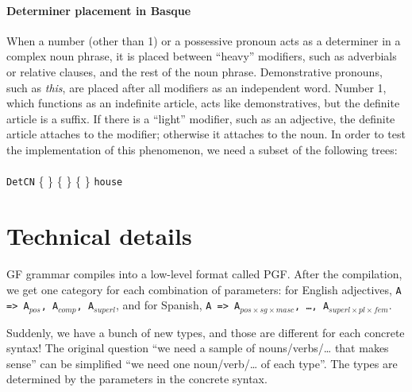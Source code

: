 \documentclass[11pt]{article}
\def\t#1{\texttt{#1}}
\newcommand{\tts}[1]{{\tt #1}}
\begin{document}


\paragraph{Determiner placement in Basque} When a number (other than 1) or a
possessive pronoun acts as a determiner in a complex noun phrase, it
is placed between ``heavy'' modifiers, such as adverbials or relative clauses,
and the rest of the noun phrase. Demonstrative pronouns, such as \emph{this}, 
 are placed after all modifiers as an independent word. Number 1,
 which functions as an indefinite article, acts like demonstratives, but
 the definite article is a suffix. If there is a ``light'' modifier,
 such as an adjective, the definite article attaches to the modifier;
 otherwise it attaches to the noun. In order to test the
 implementation of this phenomenon, we need a
subset of the following trees: \\ \\ 
\t{DetCN} \{
\stackanchor{\stackanchor{\tts{a}}{\tts{the}}}{\stackanchor{\tts{this}}{\tts{your}}}
\} \{  \} 
\{  \}  {\tt house} 



\section{Technical details}
\label{sec:details}

GF grammar compiles into a low-level format called PGF. After the
compilation, we get one category for each combination of parameters:
for English adjectives, \texttt{A => A$_{pos}$, A$_{comp}$,
A$_{superl}$}, and for Spanish, \texttt{A => A$_{pos×sg×masc}$, \dots,
A$_{superl×pl×fem}$}. 

Suddenly, we have a bunch of new types, and those are different for
each concrete syntax! The original question ``we need a sample of
nouns/verbs/… that makes sense'' can be simplified ``we need one
noun/verb/… of each type''. The types are determined by the parameters
in the concrete syntax. 
\end{document}
